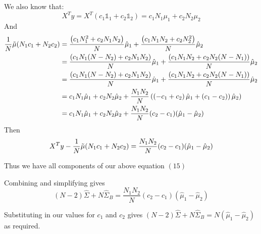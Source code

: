 We also know that:
$$X^T y = X^T(c_1 \mathbb{1}_1 + c_2 \mathbb{1}_2) = c_1 N_1 \mu_1 + c_2  N_2 \mu_2$$
And
\begin{align*}
     \frac{1}{N} \Tilde{\mu} (N_1 c_1 + N_2 c_2) &= 
\frac{\left(c_1 N_1^2 + c_2 N_1 N_2\right)}{N}\hat{\mu}_1 + \frac{\left(c_1 N_1 N_2 + c_2 N_2^2\right)}{N}\hat{\mu}_2 \\
&= \frac{\left(c_1 N_1 (N - N_2) +  c_2 N_1 N_2\right)}{N}\hat{\mu}_1 + \frac{\left(c_1 N_1 N_2 + c_2 N_2(N - N_1)\right)}{N}\hat{\mu}_2\\
&= \frac{\left(c_1 N_1 (N - N_2) +  c_2 N_1 N_2\right)}{N}\hat{\mu}_1 + \frac{\left(c_1 N_1 N_2 + c_2 N_2(N - N_1)\right)}{N}\hat{\mu}_2\\
&= c_1 N_1 \hat{\mu}_1 + c_2 N_2 \hat{\mu}_2 + \frac{N_1 N_2}{N} \left(\left(-c_1 +  c_2 \right)\hat{\mu}_1 + \left(c_1 - c_2 )\right)\hat{\mu}_2\right)\\
&= c_1 N_1 \hat{\mu}_1 + c_2 N_2 \hat{\mu}_2 + \frac{N_1 N_2}{N}(c_2 - c_1)(\hat{\mu}_1 - \hat{\mu}_2)
\end{align*}
Then 
$$X^T y - \frac{1}{N} \Tilde{\mu} (N_1 c_1 + N_2 c_2) = \frac{N_1 N_2}{N}(c_2 - c_1)(\hat{\mu}_1 - \hat{\mu}_2)$$

Thus we have all components of our above equation $(15)$

Combining and simplifying gives
$$(N-2) \hat{\Sigma} + N \hat{\Sigma}_B= \frac{N_1 N_2}{N}(c_2 - c_1)(\hat{\mu}_1 - \hat{\mu}_2) $$

Substituting in our values for $c_1$ and $c_2$ gives
$(N-2) \hat{\Sigma} + N \hat{\Sigma}_B= N(\hat{\mu}_1 - \hat{\mu}_2)  $ as required.



